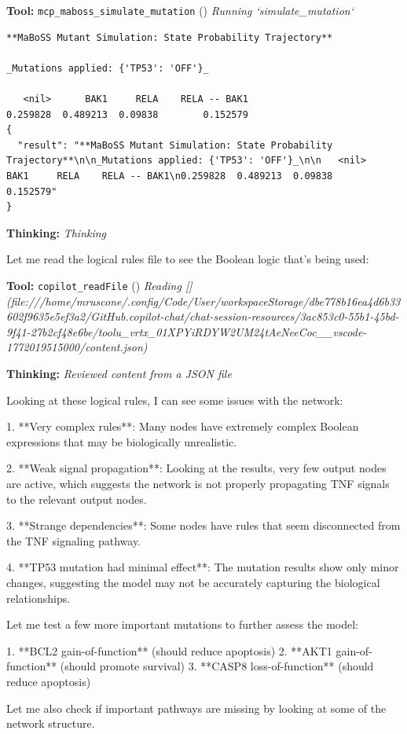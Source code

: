 \documentclass[11pt,a4paper]{article}
\begin{document}
\begin{toolokbox}
\textbf{Tool:} \texttt{mcp\_maboss\_simulate\_mutation} (\checkmark)
\textit{Running `simulate\_mutation`}
\begin{lstlisting}
**MaBoSS Mutant Simulation: State Probability Trajectory**

_Mutations applied: {'TP53': 'OFF'}_

   <nil>      BAK1     RELA    RELA -- BAK1
0.259828  0.489213  0.09838        0.152579
{
  "result": "**MaBoSS Mutant Simulation: State Probability Trajectory**\n\n_Mutations applied: {'TP53': 'OFF'}_\n\n   <nil>      BAK1     RELA    RELA -- BAK1\n0.259828  0.489213  0.09838        0.152579"
}
\end{lstlisting}
\end{toolokbox}
\begin{thinkbox}
\textbf{Thinking:} \textit{Thinking}

Let me read the logical rules file to see the Boolean logic that's being used:

\end{thinkbox}
\begin{toolokbox}
\textbf{Tool:} \texttt{copilot\_readFile} (\checkmark)
\textit{Reading [](file:///home/mruscone/.config/Code/User/workspaceStorage/dbe778b16ea4d6b33602f9635e5ef3a2/GitHub.copilot-chat/chat-session-resources/3ac853c0-55b1-45bd-9f41-27b2cf48e6be/toolu\_vrtx\_01XPYiRDYW2UM24tAeNeeCoc\_\_vscode-1772019515000/content.json)}
\end{toolokbox}
\begin{thinkbox}
\textbf{Thinking:} \textit{Reviewed content from a JSON file}

Looking at these logical rules, I can see some issues with the network:

1. **Very complex rules**: Many nodes have extremely complex Boolean expressions that may be biologically unrealistic.

2. **Weak signal propagation**: Looking at the results, very few output nodes are active, which suggests the network is not properly propagating TNF signals to the relevant output nodes.

3. **Strange dependencies**: Some nodes have rules that seem disconnected from the TNF signaling pathway.

4. **TP53 mutation had minimal effect**: The mutation results show only minor changes, suggesting the model may not be accurately capturing the biological relationships.

Let me test a few more important mutations to further assess the model:

1. **BCL2 gain-of-function** (should reduce apoptosis)
2. **AKT1 gain-of-function** (should promote survival) 
3. **CASP8 loss-of-function** (should reduce apoptosis)

Let me also check if important pathways are missing by looking at some of the network structure.

\end{thinkbox}
\end{document}
